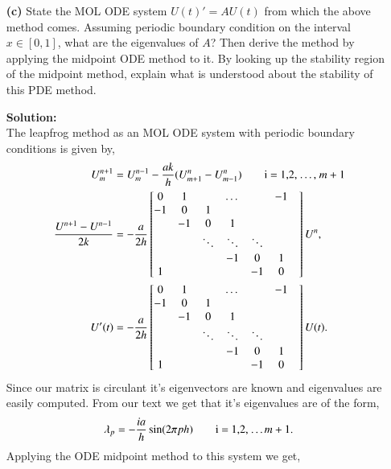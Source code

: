 \documentclass[12pt]{article}
\makeatletter
\theoremstyle{homework}
\newenvironment{exercise}[1]
{\def\@currentlabel{#1}\exercisecore}
{\endexercisecore}
\newcommand{\localhead}[1]{\par\smallskip\noindent\textbf{#1}\nobreak\\}%
\newcommand\solution{\localhead{Solution:}}
\makeatother
\begin{document}
\begin{exercise}{Problem P37}
\begin{enumerate}
 
    \item[\textbf{(c)}] State the MOL ODE system $U(t)' = AU(t)$ from which the above method comes. 
    Assuming periodic boundary condition on the interval $x \in [0, 1]$, what are the eigenvalues of $A$? Then derive the method by applying the midpoint ODE method to it. By looking up the stability region of the midpoint method, explain what is understood about the stability of this PDE method. 
    \solution The leapfrog method as an MOL ODE system with periodic boundary conditions is given by, 
    \begin{align*}
      U_m^{n+1} &= U_m^{n - 1} - \frac{ak}{h}(U_{m+1}^n - U_{m-1}^n) \qquad \text{i = 1,2, \dots, $m+1$}\\
      \dfrac{U^{n + 1} - U^{n - 1}}{2k} &=  - \dfrac{a}{2h}\begin{bmatrix}
       0 & 1  &       & \dots  &       &-1 \\
      -1 & 0  & 1     &        &       &\\
         & -1 &     0 &1       &       &\\
         &    &\ddots &\ddots  &\ddots &\\
         &    &       &-1      & 0     & 1 &\\
        1&    &       &        &-1     & 0  &
      \end{bmatrix}
      U^n,\\
      U'(t) &=  - \dfrac{a}{2h}\begin{bmatrix}
        0 & 1  &       & \dots  &       &-1 \\
       -1 & 0  & 1     &        &       &\\
          & -1 &     0 &1       &       &\\
          &    &\ddots &\ddots  &\ddots &\\
          &    &       &-1      & 0     & 1 &\\
         1&    &       &        &-1     & 0  &
       \end{bmatrix}
       U(t).\\
    \end{align*}
    Since our matrix is circulant it's eigenvectors are known and eigenvalues are easily computed. From our text we get that it's eigenvalues are of the form, 
    \begin{equation*}
      \lambda_p = -\frac{ia}{h}\sin(2\pi ph) \qquad  \text{i = 1,2, \dots $m+1$}.
    \end{equation*}
    Applying the ODE midpoint method to this system we get, 

\end{enumerate}
\end{exercise}
\end{document}
